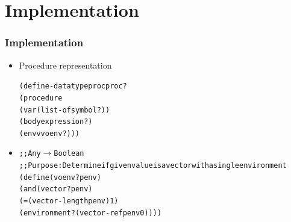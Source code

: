\documentclass{beamer}
\newcommand{\arrow}{\(\rightarrow\)}
\begin{document}
\section{Implementation}

\begin{frame}[fragile]
\frametitle{Implementation}
\begin{tiny}
\begin{itemize}
\item<1-> Procedure representation
\begin{alltt}
(define-datatype proc proc?
  (procedure
   (var (list-of symbol?))
   (body expression?)
   (envv voenv?)))
\end{alltt}

\item<2->
\begin{alltt}
;; Any \arrow{} Boolean
;; Purpose: Determine if given value is a vector with a single environment
(define (voenv? penv)
  (and (vector? penv)
       (= (vector-length penv) 1)
       (environment? (vector-ref penv 0))))
\end{alltt}


\end{itemize}
\end{tiny}
\end{frame}
\end{document}
